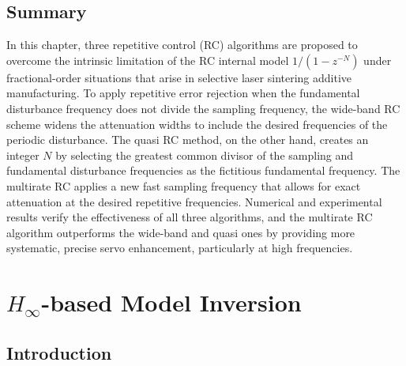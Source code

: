 \documentclass [11pt, proquest] {uwthesis}[2020/02/24]
\begin{document}
\section{Summary} \label{sec:Model-inverse-Summary}

In this chapter, three repetitive control (RC) algorithms are proposed
to overcome the intrinsic limitation of the RC internal model $1/(1-z^{-N})$
under fractional-order situations that arise in selective laser sintering
additive manufacturing. To apply repetitive error rejection when the
fundamental disturbance frequency does not divide the sampling frequency,
the wide-band RC scheme widens the attenuation widths to include the
desired frequencies of the periodic disturbance. The quasi RC method,
on the other hand, creates an integer $N$ by selecting the greatest
common divisor of the sampling and fundamental disturbance frequencies
as the fictitious fundamental frequency. The multirate RC applies
a new fast sampling frequency that allows for exact attenuation at
the desired repetitive frequencies. Numerical and experimental results
verify the effectiveness of all three algorithms, and the multirate
RC algorithm outperforms the wide-band and quasi ones by providing
more systematic, precise servo enhancement, particularly at high frequencies.


\chapter{$H_\infty$-based Model Inversion} \label{chap:Model-Inversion}

\section{Introduction} \label{sec: Model-inversion-Introduction}
\end{document}
